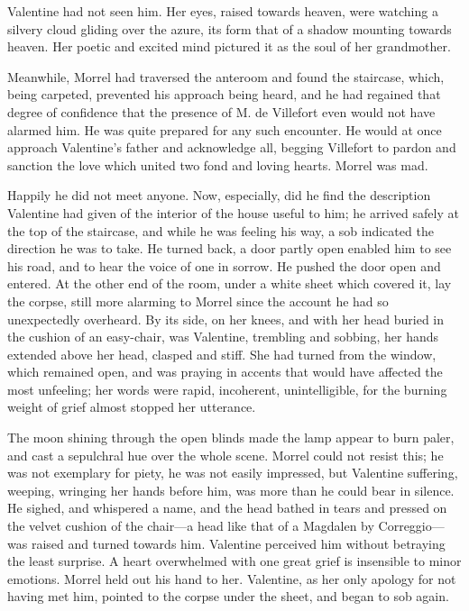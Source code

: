 Valentine had not seen him. Her eyes, raised towards heaven, were
watching a silvery cloud gliding over the azure, its form that of a
shadow mounting towards heaven. Her poetic and excited mind pictured it
as the soul of her grandmother.

Meanwhile, Morrel had traversed the anteroom and found the staircase,
which, being carpeted, prevented his approach being heard, and he had
regained that degree of confidence that the presence of M. de Villefort
even would not have alarmed him. He was quite prepared for any such
encounter. He would at once approach Valentine’s father and acknowledge
all, begging Villefort to pardon and sanction the love which united two
fond and loving hearts. Morrel was mad.

Happily he did not meet anyone. Now, especially, did he find the
description Valentine had given of the interior of the house useful to
him; he arrived safely at the top of the staircase, and while he was
feeling his way, a sob indicated the direction he was to take. He
turned back, a door partly open enabled him to see his road, and to
hear the voice of one in sorrow. He pushed the door open and entered.
At the other end of the room, under a white sheet which covered it, lay
the corpse, still more alarming to Morrel since the account he had so
unexpectedly overheard. By its side, on her knees, and with her head
buried in the cushion of an easy-chair, was Valentine, trembling and
sobbing, her hands extended above her head, clasped and stiff. She had
turned from the window, which remained open, and was praying in accents
that would have affected the most unfeeling; her words were rapid,
incoherent, unintelligible, for the burning weight of grief almost
stopped her utterance.

The moon shining through the open blinds made the lamp appear to burn
paler, and cast a sepulchral hue over the whole scene. Morrel could not
resist this; he was not exemplary for piety, he was not easily
impressed, but Valentine suffering, weeping, wringing her hands before
him, was more than he could bear in silence. He sighed, and whispered a
name, and the head bathed in tears and pressed on the velvet cushion of
the chair—a head like that of a Magdalen by Correggio—was raised and
turned towards him. Valentine perceived him without betraying the least
surprise. A heart overwhelmed with one great grief is insensible to
minor emotions. Morrel held out his hand to her. Valentine, as her only
apology for not having met him, pointed to the corpse under the sheet,
and began to sob again.

